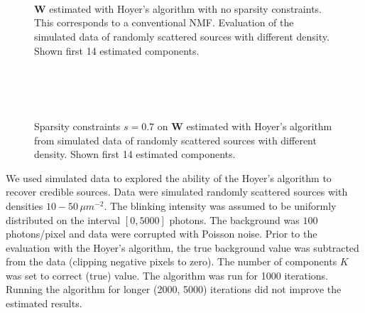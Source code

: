 \begin{figure}[!htb] %
	\newcommand{\sizefig}{.9}
	\centering
	\\
	\\
	\\	
	\caption{$\bm{W}$ estimated with Hoyer's algorithm with no sparsity constraints. This corresponds to a conventional NMF. Evaluation of the simulated data of randomly scattered sources with different density. Shown first 14 estimated components.}
	\label{fig: Hoyer no sparsity constraint}
\end{figure}

\begin{figure}[htbp!] %
	\newcommand{\sizefig}{.9}
	\centering
	\\
	\\
	\\	
	\caption{Sparsity constraints $s=0.7$ on $\bm{W}$ estimated with Hoyer's algorithm from simulated data of randomly scattered sources with different density. Shown first 14 estimated components.}
	\label{fig: Hoyer sparsity 0.7}
\end{figure}

We used simulated data to explored the ability of the Hoyer's algorithm to recover credible sources. Data were simulated randomly scattered sources with densities $10-50\,\unit{\mu m^{-2}}$. The blinking intensity  was assumed to be uniformly distributed on the interval $[0, 5000]$ photons. The background was $100$ photons/pixel and data were corrupted with Poisson noise. Prior to the evaluation with the Hoyer's algorithm, the true background value was subtracted from the data (clipping negative pixels to zero). The number of components $K$ was set to correct (true) value. The algorithm was run for 1000 iterations. Running the algorithm for longer (2000, 5000) iterations did not improve the estimated results. 

